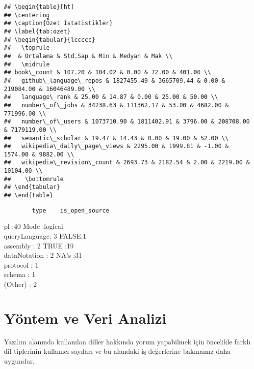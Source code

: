 \documentclass[
  12pt,
]{article}
\begin{document}
\begin{verbatim}
## \begin{table}[ht]
## \centering
## \caption{Özet İstatistikler} 
## \label{tab:ozet}
## \begin{tabular}{lccccc}
##   \toprule
##  & Ortalama & Std.Sap & Min & Medyan & Mak \\ 
##   \midrule
## book\_count & 107.20 & 104.02 & 0.00 & 72.00 & 401.00 \\ 
##   github\_language\_repos & 1827455.49 & 3665709.44 & 0.00 & 219084.00 & 16046489.00 \\ 
##   language\_rank & 25.00 & 14.87 & 0.00 & 25.00 & 50.00 \\ 
##   number\_of\_jobs & 34238.63 & 111362.17 & 53.00 & 4682.00 & 771996.00 \\ 
##   number\_of\_users & 1073710.90 & 1811402.91 & 3796.00 & 208708.00 & 7179119.00 \\ 
##   semantic\_scholar & 19.47 & 14.43 & 0.00 & 19.00 & 52.00 \\ 
##   wikipedia\_daily\_page\_views & 2295.00 & 1999.81 & -1.00 & 1574.00 & 9882.00 \\ 
##   wikipedia\_revision\_count & 2693.73 & 2182.54 & 2.00 & 2219.00 & 10104.00 \\ 
##    \bottomrule
## \end{tabular}
## \end{table}
\end{verbatim}

\begin{verbatim}
        type    is_open_source 
\end{verbatim}

pl :40 Mode :logical\\
queryLanguage: 3 FALSE:1\\
assembly : 2 TRUE :19\\
dataNotation : 2 NA's :31\\
protocol : 1\\
schema : 1\\
(Other) : 2

\hypertarget{yuxf6ntem-ve-veri-analizi}{%
\section{Yöntem ve Veri Analizi}\label{yuxf6ntem-ve-veri-analizi}}

Yazılım alanında kullanılan diller hakkında yorum yapabilmek için öncelikle farklı dil tiplerinin kullanıcı sayıları ve bu alandaki iş değerlerine bakmamız daha uygundur.
\end{document}
